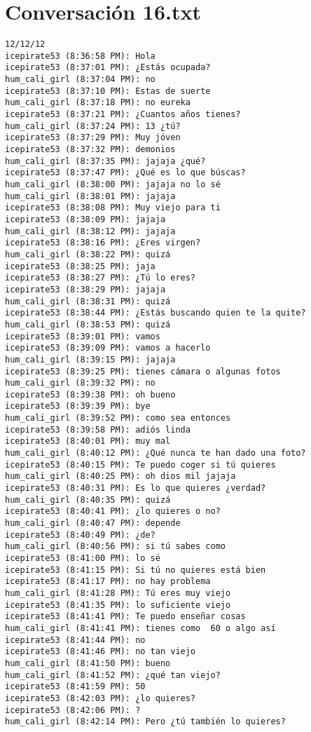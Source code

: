 \section{Conversaci\'on 16.txt}

\begin{verbatim}
12/12/12
icepirate53 (8:36:58 PM): Hola
icepirate53 (8:37:01 PM): ¿Estás ocupada?
hum_cali_girl (8:37:04 PM): no
icepirate53 (8:37:10 PM): Estas de suerte
hum_cali_girl (8:37:18 PM): no eureka
icepirate53 (8:37:21 PM): ¿Cuantos años tienes?
hum_cali_girl (8:37:24 PM): 13 ¿tú?
icepirate53 (8:37:29 PM): Muy jóven
icepirate53 (8:37:32 PM): demonios
hum_cali_girl (8:37:35 PM): jajaja ¿qué?
icepirate53 (8:37:47 PM): ¿Qué es lo que búscas?
hum_cali_girl (8:38:00 PM): jajaja no lo sé 
hum_cali_girl (8:38:01 PM): jajaja
icepirate53 (8:38:08 PM): Muy viejo para ti
icepirate53 (8:38:09 PM): jajaja
hum_cali_girl (8:38:12 PM): jajaja
icepirate53 (8:38:16 PM): ¿Eres virgen?
hum_cali_girl (8:38:22 PM): quizá
icepirate53 (8:38:25 PM): jaja
icepirate53 (8:38:27 PM): ¿Tú lo eres?
icepirate53 (8:38:29 PM): jajaja
hum_cali_girl (8:38:31 PM): quizá
icepirate53 (8:38:44 PM): ¿Estás buscando quien te la quite?
hum_cali_girl (8:38:53 PM): quizá
icepirate53 (8:39:01 PM): vamos
icepirate53 (8:39:09 PM): vamos a hacerlo
hum_cali_girl (8:39:15 PM): jajaja
icepirate53 (8:39:25 PM): tienes cámara o algunas fotos
hum_cali_girl (8:39:32 PM): no
icepirate53 (8:39:38 PM): oh bueno
icepirate53 (8:39:39 PM): bye
hum_cali_girl (8:39:52 PM): como sea entonces
icepirate53 (8:39:58 PM): adiós linda
icepirate53 (8:40:01 PM): muy mal
hum_cali_girl (8:40:12 PM): ¿Qué nunca te han dado una foto?
icepirate53 (8:40:15 PM): Te puedo coger si tú quieres
hum_cali_girl (8:40:25 PM): oh dios mil jajaja
icepirate53 (8:40:31 PM): Es lo que quieres ¿verdad?
hum_cali_girl (8:40:35 PM): quizá
icepirate53 (8:40:41 PM): ¿lo quieres o no?
hum_cali_girl (8:40:47 PM): depende
icepirate53 (8:40:49 PM): ¿de?
hum_cali_girl (8:40:56 PM): si tú sabes como
icepirate53 (8:41:00 PM): lo sé
icepirate53 (8:41:15 PM): Si tú no quieres está bien
icepirate53 (8:41:17 PM): no hay problema
hum_cali_girl (8:41:28 PM): Tú eres muy viejo
icepirate53 (8:41:35 PM): lo suficiente viejo
icepirate53 (8:41:41 PM): Te puedo enseñar cosas
hum_cali_girl (8:41:41 PM): tienes como  60 o algo así
icepirate53 (8:41:44 PM): no
icepirate53 (8:41:46 PM): no tan viejo
hum_cali_girl (8:41:50 PM): bueno
hum_cali_girl (8:41:52 PM): ¿qué tan viejo?
icepirate53 (8:41:59 PM): 50
icepirate53 (8:42:03 PM): ¿lo quieres?
icepirate53 (8:42:06 PM): ?
hum_cali_girl (8:42:14 PM): Pero ¿tú también lo quieres?

\end{verbatim}
